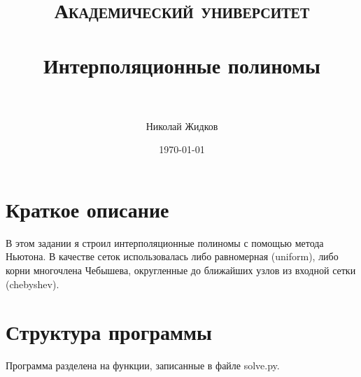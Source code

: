 \documentclass[paper=a4, fontsize=11pt]{scrartcl} %
\title{	
\normalfont \normalsize 
\textsc{Академический университет} \\ [25pt] %
\horrule{0.5pt} \\[0.4cm] %
\huge Интерполяционные полиномы \\ %
\horrule{2pt} \\[0.5cm] %
}
\author{Николай Жидков} %
\date{\normalsize\today} %
\numberwithin{equation}{section} %
\numberwithin{figure}{section} %
\numberwithin{table}{section} %
\begin{document}
\maketitle %


\section{Краткое описание}

В этом задании я строил интерполяционные полиномы с помощью метода Ньютона.
В качестве сеток использовалась либо равномерная (uniform), либо корни многочлена Чебышева, округленные до ближайших узлов из входной сетки (chebyshev).


\section{Структура программы}

Программа разделена на функции, записанные в файле solve.py. 
\end{document}
